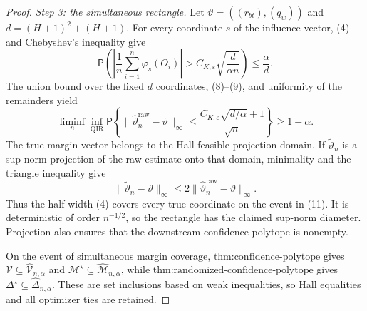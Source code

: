 \documentclass{article}
\begin{document}
\begin{proof}
\emph{Step 3: the simultaneous rectangle.}
Let \(\vartheta=((r_{bt}),(q_w))\) and \(d=(H+1)^2+(H+1)\).  For every coordinate \(s\) of the influence vector, (4) and Chebyshev's inequality give
\[
 \mathsf P\!\left(
 \left|\frac1n\sum_{i=1}^n\varphi_s(O_i)\right|
 >C_{K,\varepsilon}\sqrt{\frac d{\alpha n}}\right)
 \le\frac\alpha d.                                      \tag{10}
\]
The union bound over the fixed \(d\) coordinates, (8)--(9), and uniformity of the remainders yield
\[
 \liminf_n\inf_{\operatorname{QIR}}
 \mathsf P\!\left\{
 \lVert\widehat\vartheta_n^{\mathrm{raw}}-\vartheta\rVert_\infty
 \le\frac{C_{K,\varepsilon}\sqrt{d/\alpha}+1}{\sqrt n}
 \right\}\ge1-\alpha.                                  \tag{11}
\]
The true margin vector belongs to the Hall-feasible projection domain.  If \(\widetilde\vartheta_n\) is a sup-norm projection of the raw estimate onto that domain, minimality and the triangle inequality give
\[
 \lVert\widetilde\vartheta_n-\vartheta\rVert_\infty
 \le2\lVert\widehat\vartheta_n^{\mathrm{raw}}-\vartheta\rVert_\infty. \tag{12}
\]
Thus the half-width (4) covers every true coordinate on the event in (11).  It is deterministic of order \(n^{-1/2}\), so the rectangle has the claimed sup-norm diameter.  Projection also ensures that the downstream confidence polytope is nonempty.

On the event of simultaneous margin coverage, \(\text{thm:confidence-polytope}\) gives
\(\mathcal V\subseteq\widehat{\mathcal V}_{n,\alpha}\) and
\(\mathcal M^\star\subseteq\widehat{\mathcal M}_{n,\alpha}\), while
\(\text{thm:randomized-confidence-polytope}\) gives
\(\Delta^\star\subseteq\widehat\Delta_{n,\alpha}\).  These are set inclusions based on weak inequalities, so Hall equalities and all optimizer ties are retained.


\end{proof}
\end{document}
